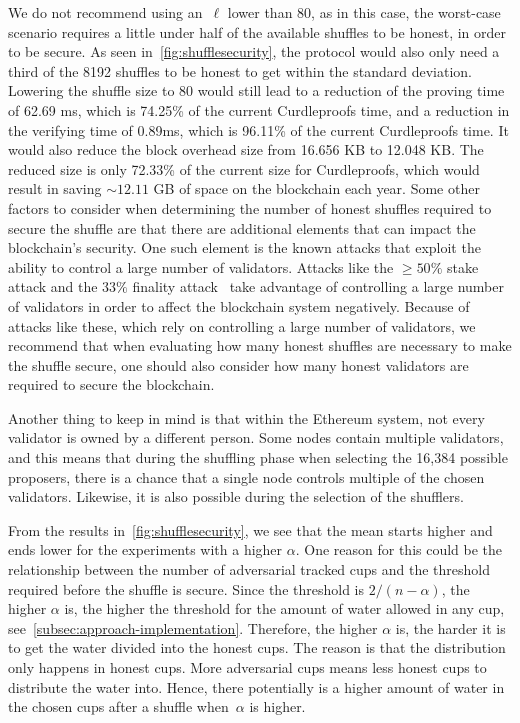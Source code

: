 We do not recommend using an~$\ell$ lower than 80, as in this case, the worst-case scenario requires a little under half of the available shuffles to be honest, in order to be secure.
As seen in~\autoref{fig:shufflesecurity}, the protocol would also only need a third of the 8192 shuffles to be honest to get within the standard deviation.
Lowering the shuffle size to 80 would still lead to a reduction of the proving time of 62.69 ms, which is 74.25\% of the current Curdleproofs time, and a reduction in the verifying time of 0.89ms, which is 96.11\% of the current Curdleproofs time.
It would also reduce the block overhead size from 16.656 KB to 12.048 KB\@.
The reduced size is only 72.33\% of the current size for Curdleproofs, which would result in saving $\sim12.11$ GB of space on the blockchain each year.
Some other factors to consider when determining the number of honest shuffles required to secure the shuffle are that there are additional elements that can impact the blockchain's security.
One such element is the known attacks that exploit the ability to control a large number of validators.
Attacks like the $\geq50\%$ stake attack and the $33\%$ finality attack~\cite{EthereumAttackDefense2024} take advantage of controlling a large number of validators in order to affect the blockchain system negatively.
Because of attacks like these, which rely on controlling a large number of validators, we recommend that when evaluating how many honest shuffles are necessary to make the shuffle secure, one should also consider how many honest validators are required to secure the blockchain.

Another thing to keep in mind is that within the Ethereum system, not every validator is owned by a different person.
Some nodes contain multiple validators, and this means that during the shuffling phase when selecting the 16,384 possible proposers, there is a chance that a single node controls multiple of the chosen validators.
Likewise, it is also possible during the selection of the shufflers.

From the results in~\autoref{fig:shufflesecurity}, we see that the mean starts higher and ends lower for the experiments with a higher $\alpha$.
One reason for this could be the relationship between the number of adversarial tracked cups and the threshold required before the shuffle is secure.
Since the threshold is $2/(n-\alpha)$, the higher $\alpha$ is, the higher the threshold for the amount of water allowed in any cup, see~\autoref{subsec:approach-implementation}.
Therefore, the higher $\alpha$ is, the harder it is to get the water divided into the honest cups.
The reason is that the distribution only happens in honest cups.
More adversarial cups means less honest cups to distribute the water into.
Hence, there potentially is a higher amount of water in the chosen cups after a shuffle when~$\alpha$ is higher.
